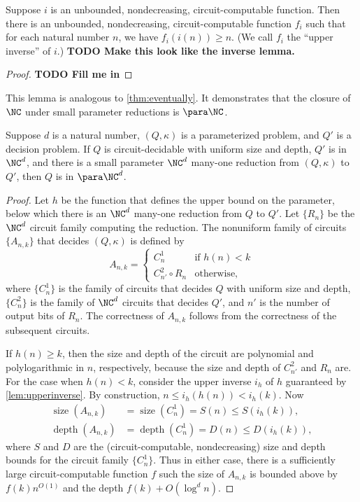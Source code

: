 \documentclass{article}
\newcommand{\todo}[1]{\textbf{TODO #1}}
\DeclareMathOperator{\depth}{depth}
\DeclareMathOperator{\size}{size}
\begin{document}
\begin{lemma}\label{lem:upperinverse}
  Suppose $i$ is an unbounded, nondecreasing, circuit-computable function.
  Then there is an unbounded, nondecreasing, circuit-computable function $f_i$ such that for each natural number $n$, we have $f_i(i(n)) \geq n$.
  (We call $f_i$ the ``upper inverse'' of $i$.)
  \todo{Make this look like the inverse lemma.}
\end{lemma}
\begin{proof}
  \todo{Fill me in}
\end{proof}

This lemma is analogous to \autoref{thm:eventually}.
It demonstrates that the closure of $\NC$ under small parameter reductions is $\para \NC$.

\begin{lemma}\label{lem:spreduction}
  Suppose $d$ is a natural number, $(Q, \kappa)$ is a parameterized problem, and $Q'$ is a decision problem.
  If $Q$ is circuit-decidable with uniform size and depth, $Q'$ is in $\NC^d$, and there is a small parameter $\NC^d$ many-one reduction from $(Q, \kappa)$ to $Q'$, then $Q$ is in $\para \NC^d$.
\end{lemma}
\begin{proof}
  Let $h$ be the function that defines the upper bound on the parameter, below which there is an $\NC^d$ many-one reduction from $Q$ to $Q'$.
  Let $\{R_n\}$ be the $\NC^d$ circuit family computing the reduction.
  The nonuniform family of circuits $\{A_{n, k}\}$ that decides $(Q, \kappa)$ is defined by
  \[
  A_{n, k} =
  \begin{cases}
    C_n^1 & \text{if } h(n) < k \\
    C_{n'}^2 \circ R_{n} & \text{otherwise},
  \end{cases}
  \]
  where $\{C_n^1\}$ is the family of circuits that decides $Q$ with uniform size and depth, $\{C_n^2\}$ is the family of $\NC^d$ circuits that decides $Q'$, and $n'$ is the number of output bits of $R_n$.
  The correctness of $A_{n, k}$ follows from the correctness of the subsequent circuits.

  If $h(n) \geq k$, then the size and depth of the circuit are polynomial and polylogarithmic in $n$, respectively, because the size and depth of $C_{n'}^2$ and $R_n$ are.
  For the case when $h(n) < k$, consider the upper inverse $i_h$ of $h$ guaranteed by \autoref{lem:upperinverse}.
  By construction, $n \leq i_h(h(n)) < i_h(k)$.
  Now
  \begin{align*}
    \size(A_{n, k}) & = \size(C_n^1) = S(n) \leq S(i_h(k)), \\
    \depth(A_{n, k}) & = \depth(C_n^1) = D(n) \leq D(i_h(k)),
  \end{align*}
  where $S$ and $D$ are the (circuit-computable, nondecreasing) size and depth bounds for the circuit family $\{C_n^1\}$.
  Thus in either case, there is a sufficiently large circuit-computable function $f$ such the size of $A_{n, k}$ is bounded above by $f(k) n^{O(1)}$ and the depth $f(k) + O(\log^d n)$.
\end{proof}
\end{document}
